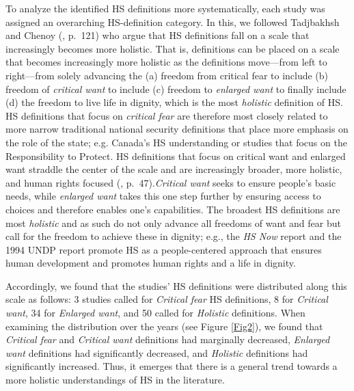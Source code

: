 \documentclass[10pt,a4paper]{article}
\begin{document}
\begin{multicols}{2}
To analyze the identified HS definitions more systematically, each study was assigned an overarching HS-definition category. In this, we followed Tadjbakhsh and Chenoy (\cite{R13}, p.~121) who argue that HS definitions fall on a scale that increasingly becomes more holistic. That is, definitions can be placed on a scale that becomes increasingly more holistic as the definitions move---from left to right---from solely advancing the (a) freedom from critical fear to include (b) freedom of \textit{critical want} to include (c) freedom to \textit{enlarged want} to finally include (d) the freedom to live life in dignity, which is the most \textit{holistic} definition of HS. HS definitions that focus on \textit{critical fear} are therefore most closely related to more narrow traditional national security definitions that place more emphasis on the role of the state; e.g. Canada's HS understanding or studies that focus on the Responsibility to Protect. HS definitions that focus on critical want and enlarged want straddle the center of the scale and are increasingly broader, more holistic, and human rights focused  (\cite{R13}, p.~47).\textit{Critical want} seeks to ensure people's basic needs, while \textit{enlarged want} takes this one step further by ensuring access to choices and therefore enables one's capabilities. The broadest HS definitions are most \textit{holistic}  and as such do not only advance all freedoms of want and fear but call for the freedom to achieve these in dignity; e.g., the \textit{HS Now} report and the 1994 UNDP report promote HS as a people-centered approach that ensures human development and promotes human rights and a life in dignity.

Accordingly, we found that the studies' HS definitions were distributed along this scale as follows: 3 studies called for \textit{Critical fear} HS definitions, 8 for \textit{Critical want}, 34 for \textit{Enlarged want}, and 50 called for \textit{Holistic} definitions. When examining the distribution over the years (see Figure \ref{Fig2}), we found that \textit{Critical fear} and \textit{Critical want} definitions had marginally decreased, \textit{Enlarged want} definitions had significantly decreased, and \textit{Holistic} definitions had significantly increased. Thus, it emerges that there is a general trend towards a more holistic understandings of HS in the literature.

\end{multicols}
\end{document}
